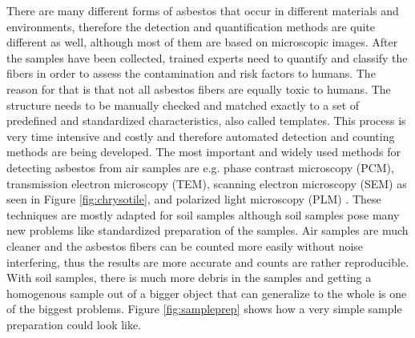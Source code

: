 There are many different forms of asbestos that occur in different materials and environments, therefore the detection and quantification methods are quite different as well, although most of them are based on microscopic images. After the samples have been collected, trained experts need to quantify and classify the fibers in order to assess the contamination and risk factors to humans. The reason for that is that not all asbestos fibers are equally toxic to humans. The structure needs to be manually checked and matched exactly to a set of predefined and standardized characteristics, also called templates. This process is very time intensive and costly and therefore automated detection and counting methods are being developed. The most important and widely used methods for detecting asbestos from air samples are e.g. phase contrast microscopy (PCM), transmission electron microscopy (TEM), scanning electron microscopy (SEM) as seen in Figure \ref{fig:chrysotile}, and polarized light microscopy (PLM) \cite{perry2004discussion}. These techniques are mostly adapted for soil samples although soil samples pose many new problems like standardized preparation of the samples. Air samples are much cleaner and the asbestos fibers can be counted more easily without noise interfering, thus the results are more accurate and counts are rather reproducible. With soil samples, there is much more debris in the samples and getting a homogenous sample out of a bigger object that can generalize to the whole is one of the biggest problems. Figure \ref{fig:sampleprep} shows how a very simple sample preparation could look like. \\

